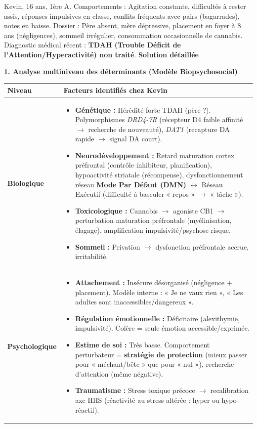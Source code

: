 \documentclass[11pt]{article}
\begin{document}
\begin{exoresolu}
Kevin, 16 ans, 1ère A. Comportements : Agitation constante, difficultés à rester assis, réponses impulsives en classe, conflits fréquents avec pairs (bagarrades), notes en baisse. Dossier : Père absent, mère dépressive, placement en foyer à 8 ans (négligences), sommeil irrégulier, consommation occasionnelle de cannabis. Diagnostic médical récent : \textbf{TDAH (Trouble Déficit de l'Attention/Hyperactivité) non traité}.
\tcblower
\textbf{Solution détaillée}

\textbf{1. Analyse multiniveau des déterminants (Modèle Biopsychosocial)}

\begin{center}
\begin{tabularx}{\linewidth}{|l|X|}\hline
\textbf{Niveau} & \textbf{Facteurs identifiés chez Kevin} \\ \hline
\textbf{Biologique} & \begin{itemize}\item \textbf{Génétique :} Hérédité forte TDAH (père ?). Polymorphismes \textit{DRD4-7R} (récepteur D4 faible affinité $\to$ recherche de nouveauté), \textit{DAT1} (recapture DA rapide $\to$ signal DA court). \item \textbf{Neurodéveloppement :} Retard maturation cortex préfrontal (contrôle inhibiteur, planification), hypoactivité striatale (récompense), dysfonctionnement réseau \textbf{Mode Par Défaut (DMN)} $\leftrightarrow$ Réseau Exécutif (difficulté à basculer « repos » $\to$ « tâche »). \item \textbf{Toxicologique :} Cannabis $\to$ agoniste CB1 $\to$ perturbation maturation préfrontale (myélinisation, élagage), amplification impulsivité/psychose risque. \item \textbf{Sommeil :} Privation $\to$ dysfonction préfrontale accrue, irritabilité. \end{itemize} \\ \hline
\textbf{Psychologique} & \begin{itemize}\item \textbf{Attachement :} Insécure désorganisé (négligence + placement). Modèle interne : « Je ne vaux rien », « Les adultes sont inaccessibles/dangereux ». \item \textbf{Régulation émotionnelle :} Déficitaire (alexithymie, impulsivité). Colère = seule émotion accessible/exprimée. \item \textbf{Estime de soi :} Très basse. Comportement perturbateur = \textbf{stratégie de protection} (mieux passer pour « méchant/bête » que pour « nul »), recherche d'attention (même négative). \item \textbf{Traumatisme :} Stress toxique précoce $\to$ recalibration axe HHS (réactivité au stress altérée : hyper ou hypo-réactif). \end{itemize} \\ \hline

\end{tabularx}
\end{center}
\end{exoresolu}
\end{document}
